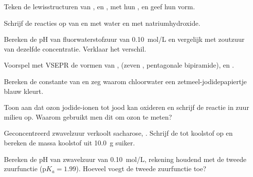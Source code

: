 \begin{exercise}[$\star$]\label{exo:b1:p-block-16-18:3}
Teken de lewisstructuren van ,  en , met hun
, en geef hun vorm.
\end{exercise}

\begin{exercise}[$\star$]\label{exo:b1:p-block-16-18:4}
Schrijf de reacties op van  en  met water en met
natriumhydroxide.
\end{exercise}

\begin{exercise}[$\star\star$]\label{exo:b1:p-block-16-18:5}
Bereken de pH van fluorwaterstofzuur van \qty{0.10}{mol/L} en vergelijk
met zoutzuur van dezelfde concentratie. Verklaar het verschil.
\end{exercise}

\begin{exercise}[$\star\star$]\label{exo:b1:p-block-16-18:6}
Voorspel met VSEPR de vormen van ,  (zeven , pentagonale bipiramide),  en .
\end{exercise}

\begin{exercise}[$\star\star$]\label{exo:b1:p-block-16-18:7}
Bereken de constante van  en zeg waarom
chloorwater een zetmeel-jodidepapiertje blauw kleurt.
\end{exercise}

\begin{exercise}[$\star\star$]\label{exo:b1:p-block-16-18:8}
Toon aan dat ozon jodide-ionen tot jood kan oxideren en schrijf de
reactie in zuur milieu op. Waarom gebruikt men dit om ozon te meten?
\end{exercise}

\begin{exercise}[$\star\star$]\label{exo:b1:p-block-16-18:9}
Geconcentreerd zwavelzuur verkoolt sacharose, . Schrijf de
 tot koolstof op en bereken de massa koolstof uit
\qty{10.0}{g} suiker.
\end{exercise}

\begin{exercise}[$\star\star\star$]\label{exo:b1:p-block-16-18:10}
Bereken de pH van zwavelzuur van \qty{0.10}{mol/L}, rekening houdend met
de tweede zuurfunctie ($\mathrm{p}K_a = 1.99$). Hoeveel voegt de tweede
zuurfunctie toe?
\end{exercise}


